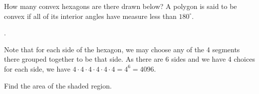 \documentclass[11pt]{article}
\begin{document}
\begin{problem} How many convex hexagons are there drawn below? A polygon is said to be convex if all of its interior angles have measure less than $180^{\circ}$. %
\end{problem}

\begin{answer} . \end{answer}
\begin{solution}
Note that for each side of the hexagon, we may choose any of the 4 segments there grouped together to be that side. As there are 6 sides and we have 4 choices for each side, we have $4 \cdot 4 \cdot 4 \cdot 4 \cdot 4 \cdot 4 = 4^6 = \boxed{4096}$.
\end{solution}

\begin{problem}Find the area of the shaded region.
	\begin{center}
	\end{center}
\end{problem}
\end{document}
